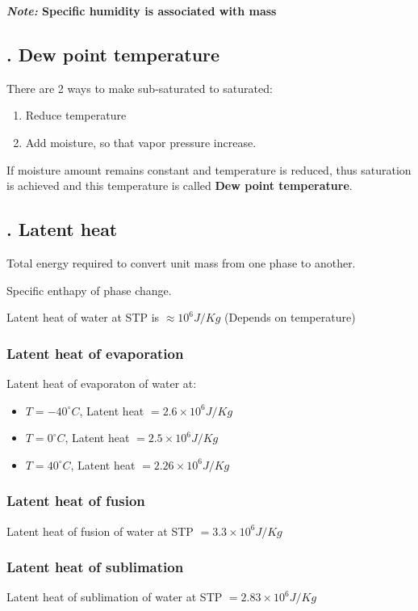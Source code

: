 \documentclass[fleqn,10pt]{SelfArx} %
\begin{document}
\textbf{\textit{Note:} Specific humidity is associated with mass}

\subsection{. Dew point temperature}
There are 2 ways to make sub-saturated to saturated:
\begin{enumerate}[noitemsep]
    \item Reduce temperature
    \item Add moisture, so that vapor pressure increase.
\end{enumerate}

If moisture amount remains constant and temperature is reduced, thus saturation is achieved and this temperature is called \textbf{Dew point temperature}.

\subsection{. Latent heat}
Total energy required to convert unit mass from one phase to another.

Specific enthapy of phase change.

Latent heat of water at STP is $\approx 10^6 J/Kg$ (Depends on temperature)

\subsubsection*{Latent heat of evaporation}
Latent heat of evaporaton of water at:
\begin{itemize}[noitemsep]
    \item $T=-40^\circ C$, \quad Latent heat $=2.6 \times 10^6J/Kg$ 
    \item $T=0^\circ C$, \quad Latent heat $=2.5 \times 10^6J/Kg$ 
    \item $T=40^\circ C$, \quad Latent heat $=2.26 \times 10^6J/Kg$ 
\end{itemize} 

\subsubsection*{Latent heat of fusion}
Latent heat of fusion of water at STP $=3.3 \times 10^6 J/Kg$

\subsubsection*{Latent heat of sublimation}
Latent heat of sublimation of water at STP $=2.83 \times 10^6 J/Kg$
\end{document}
